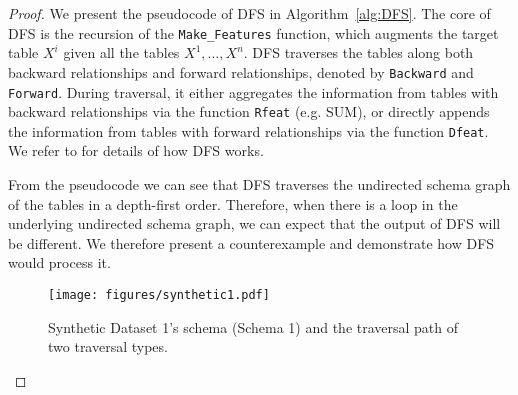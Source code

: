 \begin{proof}
    We present the pseudocode of DFS in Algorithm~\ref{alg:DFS}.  The core of DFS is the recursion of the \texttt{Make\_Features} function, which augments the target table $X^i$ given all the tables $X^1, \ldots, X^n$.  DFS traverses the tables along both backward relationships and forward relationships, denoted by \texttt{Backward} and \texttt{Forward}.  During traversal, it either aggregates the information from tables with backward relationships via the function \texttt{Rfeat} (e.g. SUM), or directly appends the information from tables with forward relationships via the function \texttt{Dfeat}.  We refer to \cite{kanter2015deep} for details of how DFS works.

    From the pseudocode we can see that DFS traverses the undirected schema graph of the tables in a depth-first order.  Therefore, when there is a loop in the underlying undirected schema graph, we can expect that the output of DFS will be different.  We therefore present a counterexample and demonstrate how DFS would process it.

    \begin{figure}
        \centering
        \texttt{[image: figures/synthetic1.pdf]}
        \caption{Synthetic Dataset 1's schema (Schema 1) and the traversal path of two traversal types.}
        \label{fig:syn-schema-1}
    \end{figure}


\end{proof}
